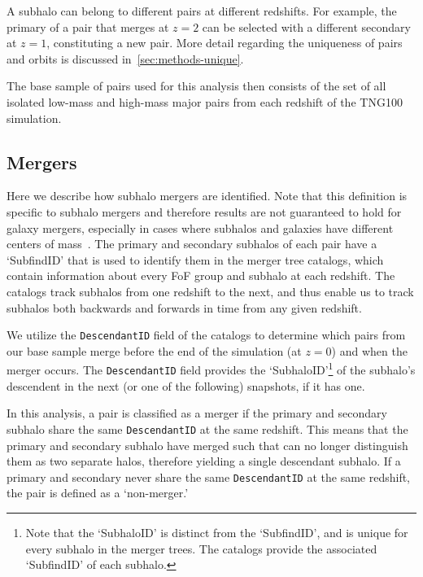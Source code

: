 \documentclass[twocolumn,linenumbers]{aastex631}
\begin{document}
A subhalo can belong to different pairs at different redshifts. 
For example, the primary of a pair that merges at $z=2$ can be selected with a different secondary at $z=1$, constituting a new pair. 
More detail regarding the uniqueness of pairs and orbits is discussed in~\ref{sec:methods-unique}.


The base sample of pairs used for this analysis then consists of the set of all
isolated 
low-mass and high-mass major pairs from each redshift of the TNG100 simulation. 

\subsection{Mergers} \label{subsec:mergers}
Here we describe how subhalo mergers are identified. 
Note that this definition is specific to subhalo mergers and therefore results are not guaranteed to hold for galaxy mergers, especially in cases where subhalos and galaxies have different centers of mass~\citep[see e.g.,]{RG2015}. %
The primary and secondary subhalos of each pair have a `SubfindID' that is used to identify them in the \subfind{} merger tree catalogs, which contain information about every FoF group and subhalo at each redshift. 
The \sublink{} catalogs track subhalos from one redshift to the next, and thus enable us to track subhalos both backwards and forwards in time from any given redshift. 

We utilize the \texttt{DescendantID} field of the \sublink{} catalogs to determine which pairs from our base sample merge before the end of the simulation (at $z=0$) and when the merger occurs. 
The \texttt{DescendantID} field provides the `SubhaloID'\footnote{Note that the `SubhaloID' is distinct from the `SubfindID', and is unique for every subhalo in the merger trees. 
The \sublink{} catalogs provide the associated `SubfindID' of each subhalo.} of the subhalo's descendent in the next (or one of the following) snapshots, if it has one. 

In this analysis, a pair is classified as a merger if the primary and secondary subhalo share the same \texttt{DescendantID} at the same redshift. 
This means that the primary and secondary subhalo have merged such that \subfind{} can no longer distinguish them as two separate halos, therefore yielding a single descendant subhalo.
If a primary and secondary never share the same \texttt{DescendantID} at the same redshift, the pair is defined as a `non-merger.'
\end{document}
